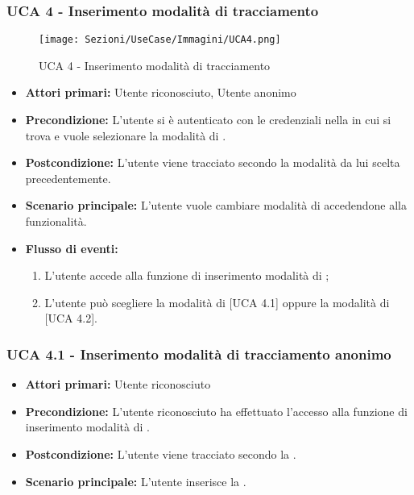 \subsubsection{UCA 4 - Inserimento modalità di tracciamento}%

\begin{figure}[h!]
	\centering	
	\texttt{[image: Sezioni/UseCase/Immagini/UCA4.png]}
	\caption{UCA 4 - Inserimento modalità di tracciamento}
\end{figure}

\begin{itemize}
	\item \textbf{Attori primari:} Utente riconosciuto, Utente anonimo
	\item \textbf{Precondizione:} L'utente si è autenticato con le credenziali  nella  in cui si trova e vuole selezionare la modalità di .
	\item \textbf{Postcondizione:} L'utente viene tracciato secondo la modalità da lui scelta precedentemente.
	\item \textbf{Scenario principale:} L'utente vuole cambiare modalità di  accedendone alla funzionalità.
	\item \textbf{Flusso di eventi:}
	\begin{enumerate}
		\item L'utente accede alla funzione di inserimento modalità di ;
		\item L'utente può scegliere la modalità di  [UCA 4.1] oppure la modalità di  [UCA 4.2].
	\end{enumerate}
\end{itemize}

\subsubsection{UCA 4.1 - Inserimento modalità di tracciamento anonimo}%
\begin{itemize}
	\item \textbf{Attori primari:} Utente riconosciuto
	\item \textbf{Precondizione:} L'utente riconosciuto ha effettuato l'accesso alla funzione di inserimento modalità di .
	\item \textbf{Postcondizione:} L'utente viene tracciato secondo la .
	\item \textbf{Scenario principale:} L'utente inserisce la .
\end{itemize}

